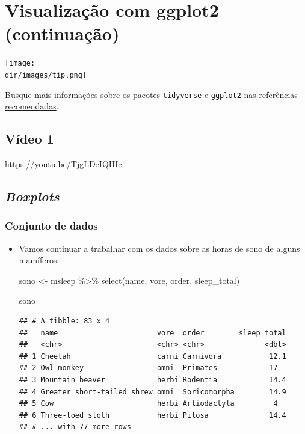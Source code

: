\documentclass[
  11pt]{report}
\newenvironment{Shaded}{\begin{snugshade}}{\end{snugshade}}
\newcommand{\FunctionTok}[1]{\textcolor[rgb]{0.00,0.00,0.00}{#1}}
\newcommand{\NormalTok}[1]{#1}
\newcommand{\OtherTok}[1]{\textcolor[rgb]{0.56,0.35,0.01}{#1}}
\newcommand{\SpecialCharTok}[1]{\textcolor[rgb]{0.00,0.00,0.00}{#1}}
\newcommand{\dir}{/ssd/R/x86_64-pc-linux-gnu-library/4.1/fnaufelRmd/rmarkdown/resources}
\newenvironment{rmdtip}
{
  \begin{mytip}
    \texttt{[image: \\dir/images/tip.png]}
    \tcblower
  }
  {
  \end{mytip}
}
\renewenvironment{Shaded}{
    \begin{mdframed}[%
      roundcorner=2pt,%
      innerleftmargin=5pt,%
      innerrightmargin=5pt,%
      topline=true,%
      leftline=true,%
      rightline=true,%
      bottomline=true,%
      linewidth=0.5pt,%
      linecolor=black!20,%
      backgroundcolor=black!2,%
      skipabove=2ex,%
      skipbelow=2.5ex%
    ]%
  }
  {
    \end{mdframed}
  }
\begin{document}
\hypertarget{viz2}{%
\chapter{Visualização com ggplot2 (continuação)}\label{viz2}}

\begin{rmdtip}
Busque mais informações sobre os pacotes \texttt{tidyverse} e \texttt{ggplot2} \protect\hyperlink{refrec}{nas referências recomendadas}.

\end{rmdtip}

\hypertarget{vuxeddeo-1-3}{%
\section{Vídeo 1}\label{vuxeddeo-1-3}}

\begin{center} \url{https://youtu.be/TjgLDeIQHIc} \end{center}

\hypertarget{boxplots}{%
\section{\texorpdfstring{\emph{Boxplots}}{Boxplots}}\label{boxplots}}

\hypertarget{conjunto-de-dados}{%
\subsection{Conjunto de dados}\label{conjunto-de-dados}}

\begin{itemize}
\item
  Vamos continuar a trabalhar com os dados sobre as horas de sono de alguns mamíferos:

\begin{Shaded}
\begin{Highlighting}[]
\NormalTok{sono }\OtherTok{\textless{}{-}}\NormalTok{ msleep }\SpecialCharTok{\%\textgreater{}\%} 
  \FunctionTok{select}\NormalTok{(name, vore, order, sleep\_total)}

\NormalTok{sono}
\end{Highlighting}
\end{Shaded}

\begin{verbatim}
## # A tibble: 83 x 4
##   name                       vore  order        sleep_total
##   <chr>                      <chr> <chr>              <dbl>
## 1 Cheetah                    carni Carnivora           12.1
## 2 Owl monkey                 omni  Primates            17  
## 3 Mountain beaver            herbi Rodentia            14.4
## 4 Greater short-tailed shrew omni  Soricomorpha        14.9
## 5 Cow                        herbi Artiodactyla         4  
## 6 Three-toed sloth           herbi Pilosa              14.4
## # ... with 77 more rows
\end{verbatim}
\end{itemize}
\end{document}
